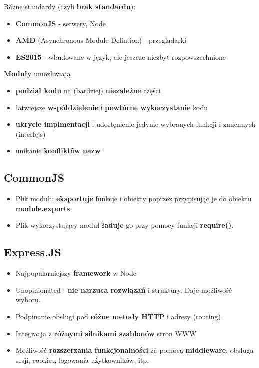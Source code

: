 \documentclass[../main.tex]{subfiles}
\begin{document}
    Różne standardy (czyli \textbf{brak standardu}):
    \begin{itemize}
        \item \textbf{CommonJS} - serwery, Node
        \item \textbf{AMD} (Asynchronous Module Defintion) - przeglądarki
        \item \textbf{ES2015} - wbudowane w język, ale jeszcze niezbyt rozpowszechnione
    \end{itemize}

    \textbf{Moduły} umożliwiają
    \begin{itemize}
        \item \textbf{podział kodu} na (bardziej) \textbf{niezależne} części
        \item łatwiejsze \textbf{współdzielenie} i \textbf{powtórne wykorzystanie} kodu
        \item \textbf{ukrycie implmentacji} i udostęnienie jedynie wybranych funkcji i zmiennych (interfejs)
        \item unikanie \textbf{konfliktów nazw}
    \end{itemize}

    \subsection{CommonJS}
    \begin{itemize}
        \item Plik modułu \textbf{eksportuje} funkcje i obiekty poprzez przypisując je do obiektu \textbf{module.exports}.
        \item Plik wykorzystujący moduł \textbf{ładuje} go przy pomocy funkcji \textbf{require()}.
    \end{itemize}

    \subsection{Express.JS}
    \begin{itemize}
        \item Najpopularniejszy \textbf{framework} w Node
        \item Unopinionated - \textbf{nie narzuca rozwiązań} i struktury. Daje możliwość wyboru.
        \item Podpinanie obsługi pod \textbf{różne metody HTTP} i adresy (routing)
        \item Integracja z \textbf{różnymi silnikami szablonów} stron WWW
        \item Możliwość \textbf{rozszerzania funkcjonalności} za pomocą \textbf{middleware}: obsługa sesji, cookies, logowania użytkowników, itp.
    \end{itemize}
\end{document}
